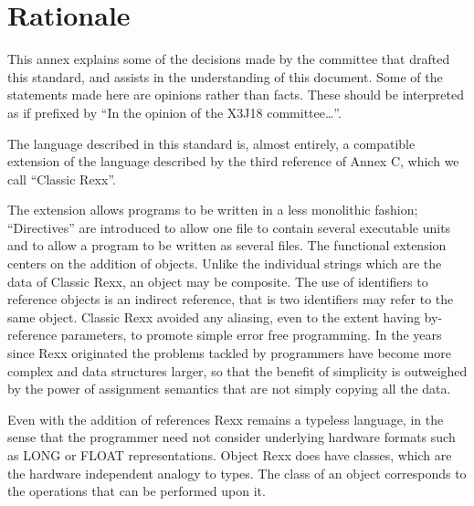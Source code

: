 \chapter{Rationale}\label{rationale}

This annex explains some of the decisions made by the committee that
drafted this standard, and assists in the understanding of this
document. Some of the statements made here are opinions rather than
facts. These should be interpreted as if prefixed by ``In the opinion of
the X3J18 committee\ldots{}''.

The language described in this standard is, almost entirely, a
compatible extension of the language described by the third reference of
Annex C, which we call ``Classic Rexx''.

The extension allows programs to be written in a less monolithic
fashion; ``Directives'' are introduced to allow one file to contain
several executable units and to allow a program to be written as several
files. The functional extension centers on the addition of objects.
Unlike the individual strings which are the data of Classic Rexx, an
object may be composite. The use of identifiers to reference objects is
an indirect reference, that is two identifiers may refer to the same
object. Classic Rexx avoided any aliasing, even to the extent having
by-reference parameters, to promote simple error free programming. In
the years since Rexx originated the problems tackled by programmers have
become more complex and data structures larger, so that the benefit of
simplicity is outweighed by the power of assignment semantics that are
not simply copying all the data.

Even with the addition of references Rexx remains a typeless language,
in the sense that the programmer need not consider underlying hardware
formats such as LONG or FLOAT representations. Object Rexx does have
classes, which are the hardware independent analogy to types. The class
of an object corresponds to the operations that can be performed upon
it.
